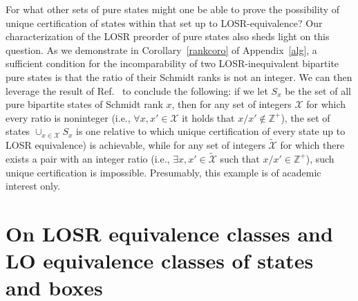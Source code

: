 \documentclass[prx,11pt,letterpaper,twocolumn,accepted=2023-11-27]{quantumarticle}
\newcommand{\rob}{\color{black}}
\newcommand{\blk}{\color{black}}
\theoremstyle{plain}
\theoremstyle{definition}
\begin{document}
\begin{appendices}
For what other sets of pure states might one be able to prove the possibility of unique certification of states within that set up to LOSR-equivalence?  Our characterization of the LOSR preorder of pure states also sheds light on this question.   
As we demonstrate in Corollary~\ref{rankcoro} of Appendix~\ref{alg}, 
a sufficient condition for the incomparability of two LOSR-inequivalent bipartite pure states is that the ratio of their Schmidt ranks is not an integer.
We can then leverage the result of Ref.~\cite{Coladangelo2017} to conclude the following:
 if we let $S_x$ be the set of all pure bipartite states of Schmidt rank $x$, then for any set of integers $\mathcal{X}$ for which every ratio is noninteger
  (i.e., $\forall x,x'\in \mathcal{X}$ it holds that $x/x' \not\in \mathbb{Z}^{+}$), the set of states $\cup_{x \in \mathcal{X}} S_x$  
is one relative to which unique certification of every state  up to LOSR equivalence) is achievable,
 while for any set of integers $\tilde{\mathcal{X}}$ for which there exists a pair with an integer ratio 
 (i.e., $\exists x,x'\in \tilde{\mathcal{X}}$ such that $x/x' \in \mathbb{Z}^{+}$), such unique certification is impossible. \rob Presumably, this example is of academic interest only.  \blk


\section{On LOSR equivalence classes and LO equivalence classes of states and boxes}
\label{discrepanciesLOSRLO}


\end{appendices}
\end{document}
